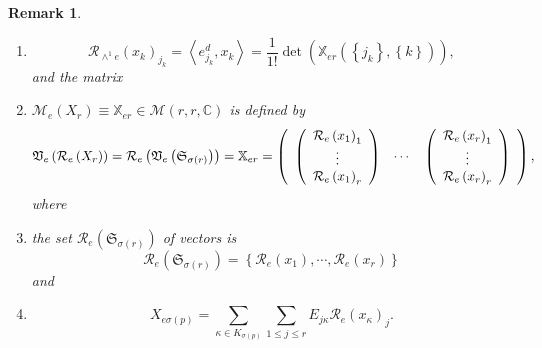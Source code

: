 \documentclass[aps,preprint]{revtex4}%
\newtheorem{remark}[theorem]{Remark}
\begin{document}
\begin{remark}
\begin{enumerate}
\item
\begin{equation}
\mathcal{R}_{\wedge^{1}e}\left(  x_{k}\right)  _{j_{k}}=\left\langle e_{j_{k}%
}^{d},x_{k}\right\rangle =\frac{1}{1!}\det\left(  \overset{}{\mathbb{X}%
_{er}\left(  \left\{  j_{k}\right\}  ,\left\{  k\right\}  \right)  }\right)  ,
\end{equation}
and the matrix

\item $\mathcal{M}_{e}\left(  X_{r}\right)  \equiv\mathbb{X}_{er}%
\in\mathcal{M}\left(  r,r,\mathbb{C}\right)  $ is defined by
\begin{equation}
\mathfrak{V}_{e}\left(  \mathcal{R}_{e}\left(  X_{r}\right)  \right)
=\mathcal{R}_{e}\left(  \mathfrak{V}_{e}\left(  \mathfrak{S}_{\sigma\left(
r\right)  }\right)  \right)  =\mathbb{X}_{er}=\left(
\begin{array}
[c]{ccc}%
\left(
\begin{array}
[c]{c}%
\mathcal{R}_{e}\left(  x_{1}\right)  _{1}\\
\vdots\\
\mathcal{R}_{e}\left(  x_{1}\right)  _{r}%
\end{array}
\right)  & \cdots & \left(
\begin{array}
[c]{c}%
\mathcal{R}_{e}\left(  x_{r}\right)  _{1}\\
\vdots\\
\mathcal{R}_{e}\left(  x_{r}\right)  _{r}%
\end{array}
\right)
\end{array}
\right)  ,
\end{equation}
where

\item the set $\mathcal{R}_{e}\left(  \mathfrak{S}_{\sigma\left(  r\right)
}\right)  $ of vectors is
\begin{equation}
\mathcal{R}_{e}\left(  \mathfrak{S}_{\sigma\left(  r\right)  }\right)
=\left\{  \mathcal{R}_{e}\left(  x_{1}\right)  ,\cdots,\mathcal{R}_{e}\left(
x_{r}\right)  \right\}
\end{equation}
and

\item
\begin{equation}
X_{e\sigma\left(  p\right)  }=\sum_{\kappa\in K_{\sigma\left(  p\right)  }%
}\sum_{1\leq j\leq r}E_{j\kappa}\mathcal{R}_{e}\left(  x_{\kappa}\right)
_{j}.
\end{equation}



\end{enumerate}
\end{remark}
\end{document}
